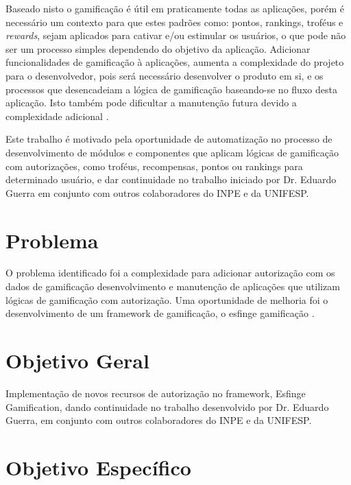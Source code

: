 \par Baseado nisto o gamificação é útil em praticamente todas as aplicações, porém é necessário um contexto para que estes padrões como: pontos, rankings, troféus e \textit{rewards}, sejam aplicados para cativar e/ou estimular os usuários, o que pode não ser um processo simples dependendo do objetivo da aplicação. Adicionar funcionalidades de gamificação à aplicações, aumenta a complexidade do projeto para o desenvolvedor, pois será necessário desenvolver o produto em si, e os processos que desencadeiam a lógica de gamificação baseando-se no fluxo desta aplicação. Isto também pode dificultar a manutenção futura devido a complexidade adicional \cite{guerra2017approach}.

\par Este trabalho é motivado pela oportunidade de automatização no processo de desenvolvimento de módulos e componentes que aplicam lógicas de gamificação com autorizações, como troféus, recompensas, pontos ou rankings para determinado usuário, e dar continuidade no trabalho iniciado por Dr. Eduardo Guerra em conjunto com outros colaboradores do INPE e da UNIFESP.

\section{Problema}

\par O problema identificado foi a complexidade para adicionar autorização com os dados de gamificação desenvolvimento e manutenção de aplicações que utilizam lógicas de gamificação com autorização. Uma oportunidade de melhoria foi o desenvolvimento de um framework de gamificação, o esfinge gamificação \cite{guerra2017approach}.

\section{Objetivo Geral}

\par Implementação de novos recursos de autorização no framework, Esfinge Gamification, dando continuidade no trabalho desenvolvido por Dr. Eduardo Guerra, em conjunto com outros colaboradores do INPE e da UNIFESP. 

\section{Objetivo Espec\'ifico}

